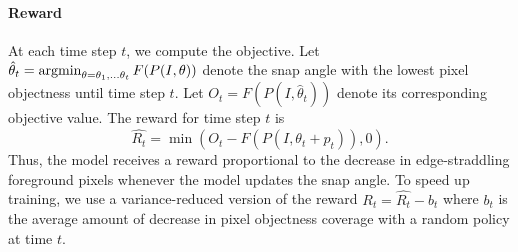 \vspace*{-0.1in}
\paragraph{Reward}

At each time step $t$, we compute the objective.  Let $\hat\theta_t=\operatorname*{argmin}_{\theta=\theta_1,\dots \theta_t}F(P(I, \theta))$ denote the snap angle with the lowest pixel objectness until time step $t$. Let $O_t=F(P(I, \hat\theta_t))$ denote its corresponding objective value.  The reward for time step $t$ is
\begin{equation}
  \hat{R_t}=\min(O_{t}-F(P(I, \theta_t+p_t)),0).
\end{equation}
Thus, the model receives a reward proportional to the decrease in edge-straddling foreground pixels whenever the model updates the snap angle.
To speed up training, we use a variance-reduced version of the reward
$R_t = \hat{R_t}-b_t$ where $b_t$ is the average amount of decrease in pixel objectness coverage with a random policy at time $t$.

 


